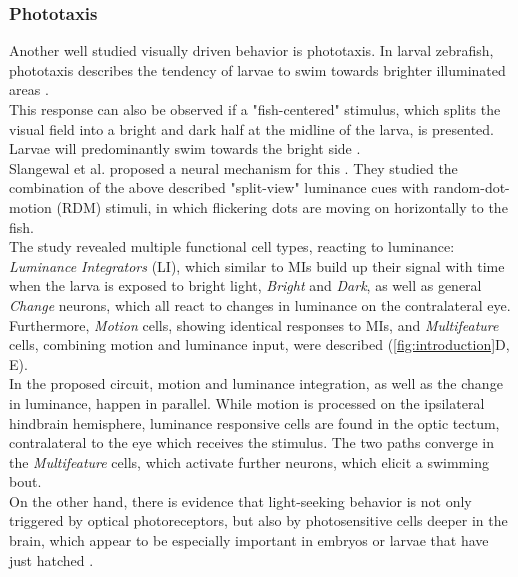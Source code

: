 \documentclass[12pt, a4paper, oneside]{article}
\begin{document}
\subsubsection{Phototaxis}
\label{sec:phototaxis}
Another well studied visually driven behavior is phototaxis. In larval zebrafish, phototaxis describes the tendency of larvae to swim towards brighter illuminated areas \parencite{orgerBehavioralScreeningAssays2004b, liZebrafishMutantsBehavioral2001, burgessDistinctRetinalPathways2010, fernandesEnlighteningBrainLinking2013}.\\
This response can also be observed if a "fish-centered" stimulus, which splits the visual field into a bright and dark half at the midline of the larva, is presented. Larvae will predominantly swim towards the bright side \parencite{capelleBehavioralAlgorithmsOntogenetic2026}.\\
Slangewal et al. proposed a neural mechanism for this \parencite{slangewalVisuomotorDecisionmakingMultifeature2026}. They studied the combination of the above described "split-view" luminance cues with random-dot-motion (RDM) stimuli, in which flickering dots are moving on horizontally to the fish.\\

The study revealed multiple functional cell types, reacting to luminance: \textit{Luminance Integrators} (LI), which similar to MIs build up their signal with time when the larva is exposed to bright light, \textit{Bright} and \textit{Dark}, as well as general \textit{Change} neurons, which all react to changes in luminance on the contralateral eye. Furthermore, \textit{Motion} cells, showing identical responses to MIs, and \textit{Multifeature} cells, combining motion and luminance input, were described (\autoref{fig:introduction}D, E).\\
In the proposed circuit, motion and luminance integration, as well as the change in luminance, happen in parallel. While motion is processed on the ipsilateral hindbrain hemisphere, luminance responsive cells are found in the optic tectum, contralateral to the eye which receives the stimulus. The two paths converge in the \textit{Multifeature} cells, which activate further neurons, which elicit a swimming bout.\\
On the other hand, there is evidence that light-seeking behavior is not only triggered by optical photoreceptors, but also by photosensitive cells deeper in the brain, which appear to be especially important in embryos or larvae that have just hatched \parencite{fernandesEnlighteningBrainLinking2013, fernandesDeepBrainPhotoreceptors2012, kokelIdentificationNonvisualPhotomotor2013}.
\end{document}
